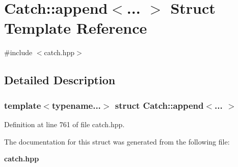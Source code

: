 \section{Catch\+::append$<$... $>$ Struct Template Reference}
\label{struct_catch_1_1append}


{\ttfamily \#include $<$catch.\+hpp$>$}



\subsection{Detailed Description}
\subsubsection*{template$<$typename...$>$\newline
struct Catch\+::append$<$... $>$}



Definition at line 761 of file catch.\+hpp.



The documentation for this struct was generated from the following file\+:\begin{DoxyCompactItemize}
\item 
\textbf{ catch.\+hpp}\end{DoxyCompactItemize}
